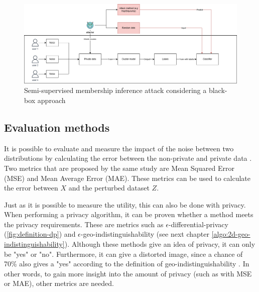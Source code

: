 

\begin{figure}
  \label{fig:unsupervised-mia-attack}
  \includegraphics[width=1.0\textwidth]{TheorethicalFramework/Differential privacy/master-thesis-MIA.png}
  \caption{Semi-supervised membership inference attack considering a black-box approach \citep{chen_hopskipjumpattack_2020,li_membership_2021}}
\end{figure}

\subsection{Evaluation methods} \label{theory:evaluation-dp}
It is possible to evaluate and measure the impact of the noise between two distributions by calculating the error between the non-private and private data \citep{del_rey_comprehensive_2020-1}.
Two metrics that are proposed by the same study are Mean Squared Error (MSE) and Mean Average Error (MAE).
These metrics can be used to calculate the error between $X$ and the perturbed dataset $Z$. \newline

Just as it is possible to measure the utility, this can also be done with privacy.
When performing a privacy algorithm, it can be proven whether a method meets the privacy requirements.
These are metrics such as $\epsilon$-differential-privacy (\ref{fig:definition-dp}) and $\epsilon$-geo-indistinguishability (see next chapter \ref{algo:2d-geo-indistinguishability}).
Although these methods give an idea of privacy, it can only be "yes" or "no".
Furthermore, it can give a distorted image, since a chance of 70\% also gives a "yes" according to the definition of geo-indistinguishability \citep{oya_is_2017}.
In other words, to gain more insight into the amount of privacy (such as with MSE or MAE), other metrics are needed.

